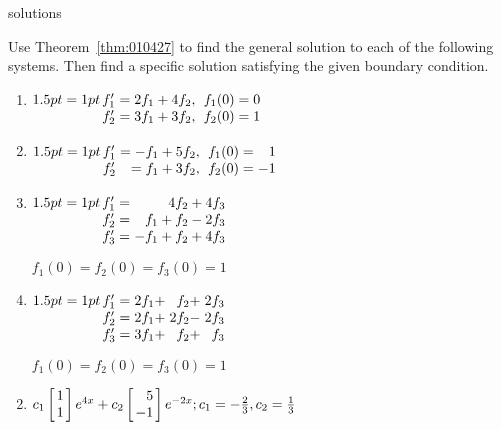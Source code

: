 \begin{Filesave}{solutions}
\end{Filesave}

\begin{multicols}{2}
\begin{ex}
Use Theorem~\ref{thm:010427}
 to find the general solution to each of the following systems. Then 
find a specific solution satisfying the given boundary condition.


\begin{enumerate}[label={\alph*.}]
\item $\arraycolsep=1pt
\begin{array}[t]{rrrl}
f_1^{\prime} & = 2f_1 + 4f_2, && f_1(0)=0 \\
f_2^{\prime} & = 3f_1 + 3f_2, && f_2(0)=1
\end{array}$


\item $\arraycolsep=1pt
\begin{array}[t]{rrrlr}
f_1^{\prime} & = -f_1 + 5f_2,& & f_1(0)=&1 \\
f_2^{\prime} & = f_1 + 3f_2, && f_2(0)=&-1
\end{array}$


\item $\arraycolsep=1pt
\begin{array}[t]{rr}
f_1^{\prime}  = &  	4f_2 + 4f_3 \\
f_2^{\prime}  = & f_1 + f_2 -2f_3 \\
f_3^{\prime}  = & -f_1 + f_2 +4f_3 \\
\end{array}$

$
f_1(0) = f_2(0) = f_3(0)=1
$


\item $\arraycolsep=1pt
\begin{array}[t]{rlrr}
f_1^{\prime}  = & 2f_1 + &f_2 + &2f_3 \\
f_2^{\prime}  = & 2f_1 + &2f_2 - &2f_3 \\
f_3^{\prime}  = & 3f_1 + &f_2 + &f_3 \\
\end{array}$

$
f_1(0) = f_2(0) = f_3(0)=1
$



\end{enumerate}
\begin{sol}
\begin{enumerate}[label={\alph*.}]
\setcounter{enumi}{1}
\item  $c_1 \leftB \begin{array}{r}
1 \\
1
\end{array} \rightB e^{4x} + c_2 \leftB \begin{array}{r}
5 \\
-1
\end{array} \rightB e^{-2x};
c_1 = -\frac{2}{3}, c_2 = \frac{1}{3}$



\end{enumerate}
\end{sol}
\end{ex}
\end{multicols}
